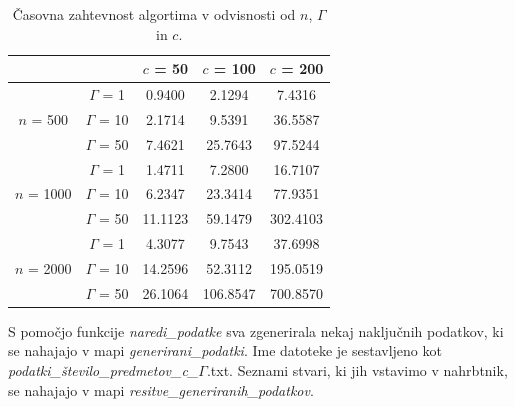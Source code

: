 \documentclass[a4paper,12pt]{article}
\theoremstyle{definition}
\begin{document}
 \begin{table}[h]
    \centering
    \begin{tabular}{c|c|c|c|c|}
    \cline{3-5}
    \multicolumn{2}{c|}{}                                     & $c$ = 50  & $c$ = 100  & $c$ = 200  \\ \hline
    \multicolumn{1}{|c|}{\multirow{3}{*}{$n$ = 500}}  & $\Gamma$ = 1 & 0.9400  & 2.1294   & 7.4316   \\ \cline{2-5} 
    \multicolumn{1}{|c|}{}                          & $\Gamma$ = 10 & 2.1714  & 9.5391   & 36.5587  \\ \cline{2-5} 
    \multicolumn{1}{|c|}{}                          & $\Gamma$ = 50 & 7.4621  & 25.7643  & 97.5244  \\ \hline
    \multicolumn{1}{|c|}{\multirow{3}{*}{$n$ = 1000}} & $\Gamma$ = 1  & 1.4711  & 7.2800   & 16.7107  \\ \cline{2-5} 
    \multicolumn{1}{|c|}{}                          & $\Gamma$ = 10 & 6.2347  & 23.3414  & 77.9351  \\ \cline{2-5} 
    \multicolumn{1}{|c|}{}                          & $\Gamma$ = 50 & 11.1123 & 59.1479  & 302.4103 \\ \hline
    \multicolumn{1}{|c|}{\multirow{3}{*}{$n$ = 2000}} & $\Gamma$ = 1  & 4.3077  & 9.7543   & 37.6998  \\ \cline{2-5} 
    \multicolumn{1}{|c|}{}                          & $\Gamma$ = 10 & 14.2596 & 52.3112  & 195.0519 \\ \cline{2-5} 
    \multicolumn{1}{|c|}{}                          & $\Gamma$ = 50 & 26.1064 & 106.8547 & 700.8570 \\ \hline
    \end{tabular}
    \caption{\label{tab:tab1}Časovna zahtevnost algortima v odvisnosti od $n$, $\Gamma$ in $c$.}
\end{table}
\par
S pomočjo funkcije \textit{naredi\_podatke} sva zgenerirala nekaj naključnih podatkov, ki se nahajajo
v mapi \textit{generirani\_podatki}. Ime datoteke je sestavljeno kot \textit{podatki\_število\_predmetov\_c\_}$\Gamma$.txt.
Seznami stvari, ki jih vstavimo v nahrbtnik, se nahajajo v mapi \textit{resitve\_generiranih\_podatkov}.
\end{document}
